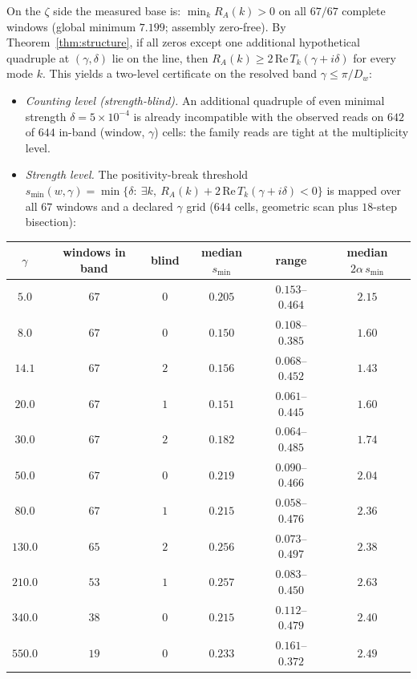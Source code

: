 \documentclass[11pt,a4paper]{article}
\theoremstyle{remark}
\begin{document}
On the $\zeta$ side the measured base is: $\min_kR_A(k)>0$ on all
$67/67$ complete windows (global minimum $7.199$; assembly zero-free).
By Theorem~\ref{thm:structure}, if all zeros except one additional
hypothetical quadruple at $(\gamma,\delta)$ lie on the line, then
$R_A(k)\ge2\,\mathrm{Re}\,T_k(\gamma+i\delta)$ for every mode $k$.
This yields a two-level certificate on the resolved band
$\gamma\le\pi/D_w$:
\begin{itemize}
\item[(i)] \emph{Counting level (strength-blind).}  An additional
quadruple of even minimal strength $\delta=5\times10^{-4}$ is already
incompatible with the observed reads on $642$ of $644$ in-band
(window, $\gamma$) cells: the family reads are tight at the
multiplicity level.
\item[(ii)] \emph{Strength level.}  The positivity-break threshold
$s_{\min}(w,\gamma)=\min\{\delta:\ \exists k,\
R_A(k)+2\,\mathrm{Re}\,T_k(\gamma+i\delta)<0\}$ is mapped over all $67$
windows and a declared $\gamma$ grid ($644$ cells, geometric scan plus
$18$-step bisection):
\end{itemize}

\begin{center}
\small
\setlength{\tabcolsep}{5.5pt}
\begin{tabular}{cccccc}
\toprule
$\gamma$ & windows in band & blind & median $s_{\min}$ &
range & median $2\alpha\,s_{\min}$\\
\midrule
$5.0$   & $67$ & $0$ & $0.205$ & $0.153$--$0.464$ & $2.15$\\
$8.0$   & $67$ & $0$ & $0.150$ & $0.108$--$0.385$ & $1.60$\\
$14.1$  & $67$ & $2$ & $0.156$ & $0.068$--$0.452$ & $1.43$\\
$20.0$  & $67$ & $1$ & $0.151$ & $0.061$--$0.445$ & $1.60$\\
$30.0$  & $67$ & $2$ & $0.182$ & $0.064$--$0.485$ & $1.74$\\
$50.0$  & $67$ & $0$ & $0.219$ & $0.090$--$0.466$ & $2.04$\\
$80.0$  & $67$ & $1$ & $0.215$ & $0.058$--$0.476$ & $2.36$\\
$130.0$ & $65$ & $2$ & $0.256$ & $0.073$--$0.497$ & $2.38$\\
$210.0$ & $53$ & $1$ & $0.257$ & $0.083$--$0.450$ & $2.63$\\
$340.0$ & $38$ & $0$ & $0.215$ & $0.112$--$0.479$ & $2.40$\\
$550.0$ & $19$ & $0$ & $0.233$ & $0.161$--$0.372$ & $2.49$\\
\bottomrule
\end{tabular}
\end{center}
\end{document}
